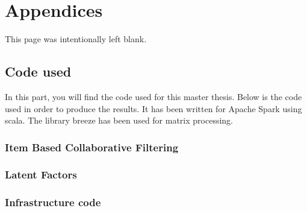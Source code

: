 \newpage
\appendix
\part{Appendices}
\newpage
\begin{center}
	This page was intentionally left blank.
\end{center}
\newpage
\chapter{Code used}
In this part, you will find the code used for this master thesis.
Below is the code used in order to produce the results. It has been 
written for Apache Spark \cite{ApacheSpark:1} using scala. The library breeze has been used for matrix processing.
\clearpage
\section{Item Based Collaborative Filtering}

\clearpage
\section{Latent Factors}

\clearpage
\section{Infrastructure code}


